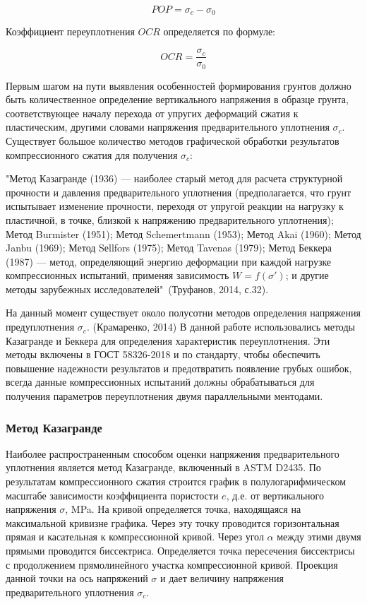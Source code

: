 \[
   POP = \sigma_c - \sigma_0
\]

Коэффициент переуплотнения $OCR$ определяется по формуле:

\[
   OCR = \frac{\sigma_c}{\sigma_0}
\]

Первым шагом на пути выявления особенностей формирования грунтов должно быть количественное определение
вертикального напряжения в образце грунта, соответствующее началу перехода от упругих деформаций сжатия к пластическим,
другими словами напряжения предварительного уплотнения $\sigma_c$. 
Существует большое количество методов графической обработки 
результатов компрессионного сжатия для получения $\sigma_c$:

"Метод Казагранде (1936) --- наиболее старый метод для расчета структурной 
прочности и давления предварительного уплотнения (предполагается, 
что грунт испытывает изменение прочности, переходя от упругой реакции на нагрузку 
к пластичной, в точке, близкой к напряжению предварительного уплотнения);
Метод Burmister (1951); Метод Schemertmann (1953); Метод Akai (1960);
Метод Janbu (1969); Метод Sеllfors (1975); Метод Tavenas (1979);
Метод Беккера (1987) --- метод, определяющий энергию деформации
при каждой нагрузке компрессионных испытаний, применяя зависимость
\(W = f(\sigma')\); и другие методы зарубежных исследователей"\ (Труфанов, 2014, с.32).
 
На данный момент существует около полусотни методов определения напряжения
предуплотнения $\sigma_c$. (Крамаренко, 2014)
В данной работе использовались методы Казагранде и Беккера для определения характеристик 
переуплотнения. Эти методы включены в ГОСТ 58326-2018 и по стандарту,
чтобы обеспечить повышение надежности результатов и предотвратить 
появление грубых ошибок, всегда данные компрессионных 
испытаний должны обрабатываться для получения параметров 
переуплотнения двумя параллельными ментодами.

\subsubsection{Метод Казагранде}

Наиболее распространенным способом оценки напряжения предварительного 
уплотнения является метод Казагранде, включенный в ASTM D2435. 
По результатам компрессионного сжатия строится график в полулогарифмическом 
масштабе зависимости коэффициента пористости $e$, д.е. от вертикального напряжения $\sigma$, \si{\mega\pascal}. 
На кривой определяется точка, находящаяся на максимальной кривизне 
графика. Через эту точку проводится горизонтальная прямая и касательная к компрессионной кривой. 
Через угол $\alpha$ между этими двумя прямыми проводится биссектриса. 
Определяется точка пересечения биссектрисы с продолжением прямолинейного 
участка компрессионной кривой. Проекция данной точки на ось напряжений $\sigma$
и дает величину напряжения предварительного уплотнения $\sigma_c$.

